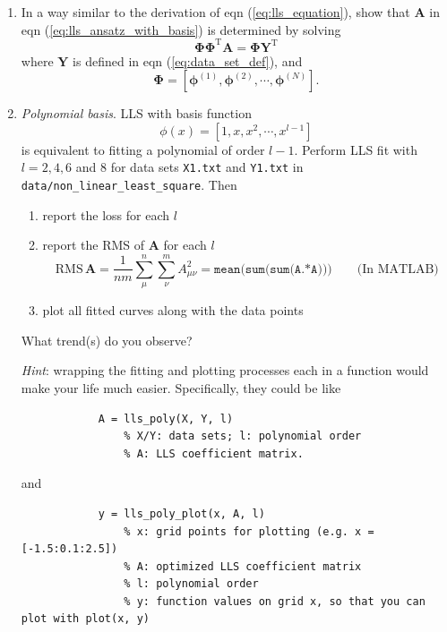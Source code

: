 \documentclass[a4paper,twoside, 10pt]{article}
\theoremstyle{wick}
\newcommand{\tr}{\textrm}
\newcommand{\mat}[1]{\mathbf{#1}}
\newcommand{\ttt}{\texttt}
\begin{document}
	\begin{enumerate}
		\item In a way similar to the derivation of eqn (\ref{eq:lls_equation}), show that $\mat{A}$ in eqn (\ref{eq:lls_ansatz_with_basis}) is determined by solving
		\begin{equation}
			\mat{\Phi} \mat{\Phi}^{\tr{T}} \mat{A}
				= \mat{\Phi} \mat{Y}^{\tr{T}}
		\end{equation}
		where $\mat{Y}$ is defined in eqn (\ref{eq:data_set_def}), and
		\begin{equation}
			\mat{\Phi}
				= [\bm{\phi}^{(1)}, \bm{\phi}^{(2)}, \cdots{}, \bm{\phi}^{(N)}].
		\end{equation}

		\item \textit{Polynomial basis}. LLS with basis function
		\begin{equation}
			\phi(x)
				= [1, x, x^2, \cdots{}, x^{l-1}]
		\end{equation}
		is equivalent to fitting a polynomial of order $l-1$. Perform LLS fit with $l = 2, 4, 6$ and $8$ for data sets \ttt{X1.txt} and \ttt{Y1.txt} in \ttt{data/non\_linear\_least\_square}. Then
		\begin{enumerate}
			\item report the loss for each $l$
			\item report the RMS of $\mat{A}$ for each $l$
			\begin{equation}
				\tr{RMS}\,\mat{A}
					= \frac{1}{nm} \sum_{\mu}^n \sum_{\nu}^m A_{\mu\nu}^2
					= \ttt{mean(sum(sum(A.*A)))}\qquad{}\tr{(In MATLAB)}
			\end{equation}
			\item plot all fitted curves along with the data points
		\end{enumerate}
		What trend(s) do you observe?

		\textit{Hint}: wrapping the fitting and plotting processes each in a function would make your life much easier. Specifically, they could be like
		\begin{verbatim}
		    A = lls_poly(X, Y, l)
		        % X/Y: data sets; l: polynomial order
		        % A: LLS coefficient matrix.
		\end{verbatim}
		and
		\begin{verbatim}
		    y = lls_poly_plot(x, A, l)
		        % x: grid points for plotting (e.g. x = [-1.5:0.1:2.5])
		        % A: optimized LLS coefficient matrix
		        % l: polynomial order
		        % y: function values on grid x, so that you can plot with plot(x, y)
		\end{verbatim}


\end{enumerate}
\end{document}
